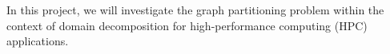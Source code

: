 \documentclass[unicode,11pt,a4paper,oneside,numbers=endperiod,openany]{scrartcl}
\theoremstyle{plain}
\begin{document}
\setassignment

\newline
In this project, we will investigate the graph partitioning problem within the context of domain decomposition for high-performance computing (HPC) applications.






\printbibliography[heading=bibintoc]
\end{document}
